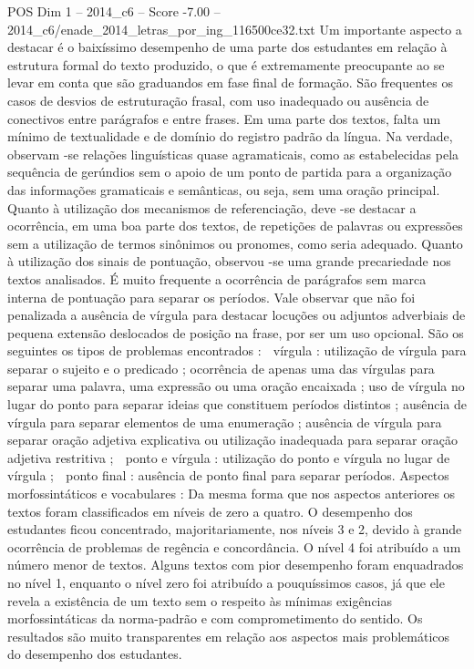\begin{textsample}{POS Dim 1 – 2014\_c6 – Score -7.00 – 2014\_c6/enade\_2014\_letras\_por\_ing\_116500ce32.txt}
Um importante aspecto a destacar é o baixíssimo desempenho de uma parte dos estudantes em relação à estrutura formal do texto produzido, o que é extremamente preocupante ao se levar em conta que são graduandos em fase final de formação.
São frequentes os casos de desvios de estruturação frasal, com uso inadequado ou ausência de conectivos entre parágrafos e entre frases.
Em uma parte dos textos, falta um mínimo de textualidade e de domínio do registro padrão da língua.
Na verdade, observam -se relações linguísticas quase agramaticais, como as estabelecidas pela sequência de gerúndios sem o apoio de um ponto de partida para a organização das informações gramaticais e semânticas, ou seja, sem uma oração principal.
Quanto à utilização dos mecanismos de referenciação, deve -se destacar a ocorrência, em uma boa parte dos textos, de repetições de palavras ou expressões sem a utilização de termos sinônimos ou pronomes, como seria adequado.
Quanto à utilização dos sinais de pontuação, observou -se uma grande precariedade nos textos analisados.
É muito frequente a ocorrência de parágrafos sem marca interna de pontuação para separar os períodos.
Vale observar que não foi penalizada a ausência de vírgula para destacar locuções ou adjuntos adverbiais de pequena extensão deslocados de posição na frase, por ser um uso opcional.
São os seguintes os tipos de problemas encontrados :  vírgula : utilização de vírgula para separar o sujeito e o predicado ; ocorrência de apenas uma das vírgulas para separar uma palavra, uma expressão ou uma oração encaixada ; uso de vírgula no lugar do ponto para separar ideias que constituem períodos distintos ; ausência de vírgula para separar elementos de uma enumeração ; ausência de vírgula para separar oração adjetiva explicativa ou utilização inadequada para separar oração adjetiva restritiva ;  ponto e vírgula : utilização do ponto e vírgula no lugar de vírgula ;  ponto final : ausência de ponto final para separar períodos.
Aspectos morfossintáticos e vocabulares : Da mesma forma que nos aspectos anteriores os textos foram classificados em níveis de zero a quatro.
O desempenho dos estudantes ficou concentrado, majoritariamente, nos níveis 3 e 2, devido à grande ocorrência de problemas de regência e concordância.
O nível 4 foi atribuído a um número menor de textos.
Alguns textos com pior desempenho foram enquadrados no nível 1, enquanto o nível zero foi atribuído a pouquíssimos casos, já que ele revela a existência de um texto sem o respeito às mínimas exigências morfossintáticas da norma-padrão e com comprometimento do sentido.
Os resultados são muito transparentes em relação aos aspectos mais problemáticos do desempenho dos estudantes.

\end{textsample}
